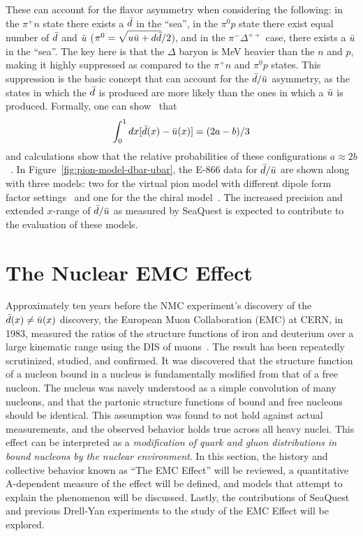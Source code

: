 These can account for the flavor asymmetry when considering the following: in the $\pi^+ n$ state there exists a $\bar{d}$ in the ``sea'', in the $\pi^0 p$ state there exist equal number of $\bar{d}$ and $\bar{u}$ ($\pi^0=\sqrt{u\bar{u}+d\bar{d}}/2$), and in the $\pi^- \Delta^{++}$ case, there exists a $\bar{u}$ in the ``sea''. The key here is that the $\Delta$ baryon is \unit[294]{MeV} heavier than the $n$ and $p$, making it highly suppressed as compared to the $\pi^+ n$ and $\pi^0 p$ states. This suppression is the basic concept that can account for the $\bar{d}/\bar{u}$ asymmetry, as the states in which the $\bar{d}$ is produced are more likely than the ones in which a $\bar{u}$ is produced. Formally, one can show~\cite{Szczurek:1993sc} that
\begin{equation}
\int_0^1 dx [\bar{d}(x)-\bar{u}(x)] = (2a-b)/3
\end{equation}
and calculations show that the relative probabilities of these configurations $a \approx 2b$~\cite{Koepf:1995yh}. In Figure~\ref{fig:pion-model-dbar-ubar}, the E-866 data for $\bar{d}/\bar{u}$ are shown along with three models: two for the virtual pion model with different dipole form factor settings~\cite{Kumano:1990mm, Koepf:1995yh} and one for the the chiral model~\cite{Szczurek:1996tp}. The increased precision and extended $x$-range of $\bar{d}/\bar{u}$ as measured by SeaQuest is expected to contribute to the evaluation of these models.

\section{The Nuclear EMC Effect}

Approximately ten years before the NMC experiment's discovery of the $\bar{d}(x)\neq\bar{u}(x)$ discovery, the European Muon Collaboration (EMC) at CERN, in 1983, measured the ratios of the structure functions of iron and deuterium over a large kinematic range using the DIS of muons~\cite{Aubert:1983xm}. The result has been repeatedly scrutinized, studied, and confirmed. It was discovered that the structure function of a nucleon bound in a nucleus is fundamentally modified from that of a free nucleon. The nucleus was navely understood as a simple convolution of many nucleons, and that the partonic structure functions of bound and free nucleons should be identical. This assumption was found to not hold against actual measurements, and the observed behavior holds true across all heavy nuclei. This effect can be interpreted as a \emph{modification of quark and gluon distributions in bound nucleons by the nuclear environment}. In this section, the history and collective behavior known as ``The EMC Effect'' will be reviewed, a quantitative A-dependent measure of the effect will be defined, and models that attempt to explain the phenomenon will be discussed. Lastly, the contributions of SeaQuest and previous Drell-Yan experiments to the study of the EMC Effect will be explored.

